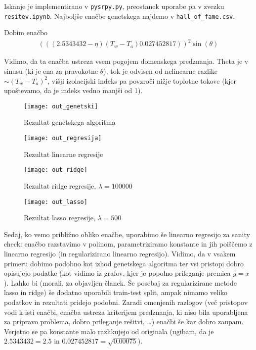 \documentclass{article}
\begin{document}
Iskanje je implementirano v \texttt{pysrpy.py}, preostanek uporabe pa v zvezku \texttt{resitev.ipynb}. Najboljše enačbe genetskega najdemo v \texttt{hall\_of\_fame.csv}.

Dobim enačbo 
\begin{align*}
    \left(((2.5343432-\eta)(T_w-T_a)0.027452817)\right)^2 \sin(\theta)
\end{align*}

Vidimo, da ta enačba ustreza vsem pogojem domenskega predznanja. Theta je v sinusu (ki je ena za pravokotne \(\theta\)), tok je odvisen od nelinearne razlike \(\sim (T_w-T_a)^2\), višji izolacijski indeks pa povzroči nižje toplotne tokove (kjer upoštevamo, da je indeks vedno manjši od 1).

\begin{figure}[htb]
    \texttt{[image: out\_genetski]}
    \caption{Rezultat genetskega algoritma}
\end{figure}
\begin{figure}[htb]
    \texttt{[image: out\_regresija]}
    \caption{Rezultat linearne regresije}
\end{figure}
\begin{figure}[htb]
    \texttt{[image: out\_ridge]}
    \caption{Rezultat ridge regresije, \(\lambda=100000\)}
\end{figure}
\begin{figure}[htb]
    \texttt{[image: out\_lasso]}
    \caption{Rezultat lasso regresije, \(\lambda=500\)}
\end{figure}
Sedaj, ko vemo približno obliko enačbe, uporabimo še linearno regresijo za sanity check: enačbo razstavimo v polinom, parametriziramo konstante in jih poiščemo z linearno regresijo (in regularizirano linearno regresijo). Vidimo, da v vsakem primeru dobimo podobno kot izhod genetskega algoritma ter vsi pristopi dobro opisujejo podatke (kot vidimo iz grafov, kjer je popolno prileganje premica \(y=x\)). Lahko bi (morali, za objavljen članek. Še posebaj za regularizirane metode lasso in ridge) še dodatno uporabili train-test split, ampak nimamo veliko podatkov in rezultati pridejo podobni. Zaradi omenjenih razlogov (več pristopov vodi k isti enačbi, enačba ustreza kriterijem predznanja, ki niso bila uporabljena za pripravo problema, dobro prileganje rešitvi, \dots) enačbi še kar dobro zaupam. Verjetno se pa konstante malo razlikujejo od originala (ugibam, da je \(2.5343432=2.5\) in \(0.027452817=\sqrt{0.00075}\)).
\end{document}
